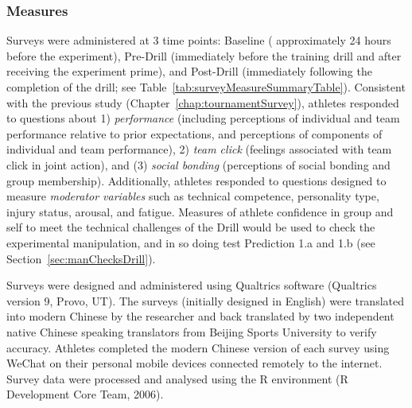 \begin{CJK}{UTF8}{gbsn}
\subsubsection{Measures}


Surveys were administered at 3 time points: Baseline ( approximately 24 hours before the experiment), Pre-Drill (immediately before the training drill and after receiving the experiment prime), and Post-Drill (immediately following the completion of the drill; see Table~\ref{tab:surveyMeasureSummaryTable}). Consistent with the previous study (Chapter~\ref{chap:tournamentSurvey}), athletes responded to questions about 1) \textit{performance} (including perceptions of individual and team performance relative to prior expectations, and perceptions of components of individual and team performance), 2) \textit{team click} (feelings associated with team click in joint action), and (3) \textit{social bonding} (perceptions of social bonding and group membership).  Additionally, athletes responded to questions designed to measure \textit{moderator variables} such as technical competence, personality type, injury status, arousal, and fatigue. Measures of athlete confidence in group and self to meet the technical challenges of the Drill would be used to check the experimental manipulation, and in so doing test Prediction 1.a and 1.b (see Section~\ref{sec:manChecksDrill}).

Surveys were designed and administered using Qualtrics software (Qualtrics version 9, Provo, UT). The surveys (initially designed in English) were translated into modern Chinese by the researcher and back translated by two independent native Chinese speaking translators from Beijing Sports University to verify accuracy.  Athletes completed the modern Chinese version of each survey using WeChat on their personal mobile devices connected remotely to the internet. Survey data were processed and analysed using the R environment (R Development Core Team, 2006).


    



\end{CJK}
